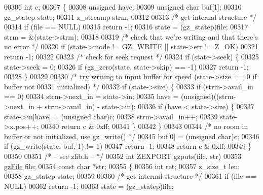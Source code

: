 \begin{DoxyCode}
00306     \textcolor{keywordtype}{int} c;
00307 \{
00308     \textcolor{keywordtype}{unsigned} have;
00309     \textcolor{keywordtype}{unsigned} \textcolor{keywordtype}{char} buf[1];
00310     gz\_statep state;
00311     z\_streamp strm;
00312 
00313     \textcolor{comment}{/* get internal structure */}
00314     \textcolor{keywordflow}{if} (file == NULL)
00315         \textcolor{keywordflow}{return} -1;
00316     state = (gz\_statep)file;
00317     strm = &(state->strm);
00318 
00319     \textcolor{comment}{/* check that we're writing and that there's no error */}
00320     \textcolor{keywordflow}{if} (state->mode != GZ\_WRITE || state->err != Z\_OK)
00321         \textcolor{keywordflow}{return} -1;
00322 
00323     \textcolor{comment}{/* check for seek request */}
00324     \textcolor{keywordflow}{if} (state->seek) \{
00325         state->seek = 0;
00326         \textcolor{keywordflow}{if} (gz\_zero(state, state->skip) == -1)
00327             \textcolor{keywordflow}{return} -1;
00328     \}
00329 
00330     \textcolor{comment}{/* try writing to input buffer for speed (state->size == 0 if buffer not}
00331 \textcolor{comment}{       initialized) */}
00332     \textcolor{keywordflow}{if} (state->size) \{
00333         \textcolor{keywordflow}{if} (strm->avail\_in == 0)
00334             strm->next\_in = state->in;
00335         have = (unsigned)((strm->next\_in + strm->avail\_in) - state->in);
00336         \textcolor{keywordflow}{if} (have < state->size) \{
00337             state->in[have] = (\textcolor{keywordtype}{unsigned} char)c;
00338             strm->avail\_in++;
00339             state->x.pos++;
00340             \textcolor{keywordflow}{return} c & 0xff;
00341         \}
00342     \}
00343 
00344     \textcolor{comment}{/* no room in buffer or not initialized, use gz\_write() */}
00345     buf[0] = (\textcolor{keywordtype}{unsigned} char)c;
00346     \textcolor{keywordflow}{if} (gz\_write(state, buf, 1) != 1)
00347         \textcolor{keywordflow}{return} -1;
00348     \textcolor{keywordflow}{return} c & 0xff;
00349 \}
00350 
00351 \textcolor{comment}{/* -- see zlib.h -- */}
00352 \textcolor{keywordtype}{int} ZEXPORT gzputs(file, str)
00353     \hyperlink{structgz_file__s}{gzFile} file;
00354     \textcolor{keyword}{const} \textcolor{keywordtype}{char} *str;
00355 \{
00356     \textcolor{keywordtype}{int} ret;
00357     z\_size\_t len;
00358     gz\_statep state;
00359 
00360     \textcolor{comment}{/* get internal structure */}
00361     \textcolor{keywordflow}{if} (file == NULL)
00362         \textcolor{keywordflow}{return} -1;
00363     state = (gz\_statep)file;

\end{DoxyCode}
